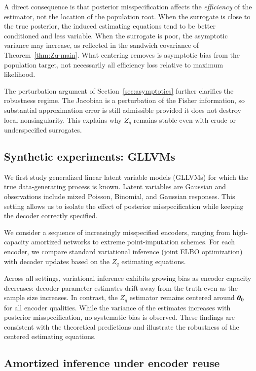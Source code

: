 \documentclass[twoside,11pt]{article}
\begin{document}
A direct consequence is that posterior misspecification affects the
\emph{efficiency} of the estimator, not the location of the population root.
When the surrogate is close to the true posterior, the induced estimating equations
tend to be better conditioned and less variable. When the surrogate is poor, the
asymptotic variance may increase, as reflected in the sandwich covariance of
Theorem~\ref{thm:Zq-main}. What centering removes is asymptotic bias from the
population target, not necessarily all efficiency loss relative to maximum
likelihood.

The perturbation argument of Section~\ref{sec:asymptotics} further clarifies the
robustness regime. The Jacobian is a perturbation of the Fisher information, so
substantial approximation error is still admissible provided it does not destroy
local nonsingularity. This explains why $Z_q$ remains stable even with crude or
underspecified surrogates.

\subsection{Synthetic experiments: GLLVMs}

We first study generalized linear latent variable models (GLLVMs) for which the
true data-generating process is known.  Latent variables are Gaussian and
observations include mixed Poisson, Binomial, and Gaussian responses.  This setting
allows us to isolate the effect of posterior misspecification while keeping the
decoder correctly specified.

We consider a sequence of increasingly misspecified encoders, ranging from
high-capacity amortized networks to extreme point-imputation schemes.  For each
encoder, we compare standard variational inference (joint ELBO optimization) with
decoder updates based on the $Z_q$ estimating equations.

Across all settings, variational inference exhibits growing bias as encoder
capacity decreases: decoder parameter estimates drift away from the truth even as
the sample size increases.  In contrast, the $Z_q$ estimator remains centered around
${\bm{\theta}}_0$ for all encoder qualities.  While the variance of the estimates increases
with posterior misspecification, no systematic bias is observed.  These findings
are consistent with the theoretical predictions and illustrate the robustness of
the centered estimating equations.

\subsection{Amortized inference under encoder reuse}
\end{document}
